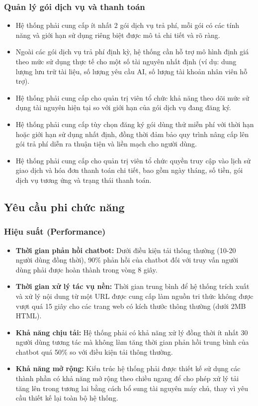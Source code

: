 \subsubsection{Quản lý gói dịch vụ và thanh toán}
\begin{itemize}
    \item Hệ thống phải cung cấp ít nhất 2 gói dịch vụ trả phí, mỗi gói có các tính năng và giới hạn sử dụng riêng biệt được mô tả chi tiết và rõ ràng.
    \item Ngoài các gói dịch vụ trả phí định kỳ, hệ thống cần hỗ trợ mô hình định giá theo mức sử dụng thực tế cho một số tài nguyên nhất định (ví dụ: dung lượng lưu trữ tài liệu, số lượng yêu cầu AI, số lượng tài khoản nhân viên hỗ trợ).
    \item Hệ thống phải cung cấp cho quản trị viên tổ chức khả năng theo dõi mức sử dụng tài nguyên hiện tại so với giới hạn của gói dịch vụ đang đăng ký.
    \item Hệ thống phải cung cấp tùy chọn đăng ký gói dùng thử miễn phí với thời hạn hoặc giới hạn sử dụng nhất định, đồng thời đảm bảo quy trình nâng cấp lên gói trả phí diễn ra thuận tiện và liền mạch cho người dùng.
    \item Hệ thống phải cung cấp cho quản trị viên tổ chức quyền truy cập vào lịch sử giao dịch và hóa đơn thanh toán chi tiết, bao gồm ngày tháng, số tiền, gói dịch vụ tương ứng và trạng thái thanh toán.
\end{itemize}


\subsection{Yêu cầu phi chức năng}

\subsubsection{Hiệu suất (Performance)}
\begin{itemize}
    \item \textbf{Thời gian phản hồi chatbot:} Dưới điều kiện tải thông thường (10-20 người dùng đồng thời), 90\% phản hồi của chatbot đối với truy vấn người dùng phải được hoàn thành trong vòng 8 giây.
    \item \textbf{Thời gian xử lý tác vụ nền:} Thời gian trung bình để hệ thống trích xuất và xử lý nội dung từ một URL được cung cấp làm nguồn tri thức không được vượt quá 15 giây cho các trang web có kích thước thông thường (dưới 2MB HTML).
    \item \textbf{Khả năng chịu tải:} Hệ thống phải có khả năng xử lý đồng thời ít nhất 30 người dùng tương tác mà không làm tăng thời gian phản hồi trung bình của chatbot quá 50\% so với điều kiện tải thông thường.
    \item \textbf{Khả năng mở rộng:} Kiến trúc hệ thống phải được thiết kế sử dụng các thành phần có khả năng mở rộng theo chiều ngang để cho phép xử lý tải tăng lên trong tương lai bằng cách bổ sung tài nguyên máy chủ, thay vì yêu cầu thiết kế lại toàn bộ hệ thống.
\end{itemize}

